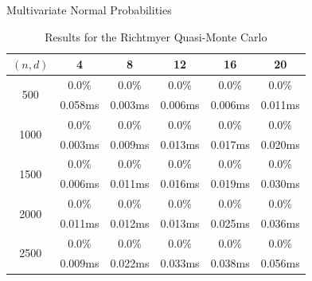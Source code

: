 \begin{frame}{Multivariate Normal Probabilities} 
	\begin{table}[!h]
		\centering
		{
			\begin{tabular}{@{}cccccc@{}}
				\toprule
				$(n, d)$ 				  & 4 		& 8 	  & 12 		& 16 	  & 20	 \\ \midrule
				\multirow{2}{*}{500}  & 0.0\%   & 0.0\%   & 0.0\%   & 0.0\%   & 0.0\% \\
									& 0.058ms & 0.003ms & 0.006ms & 0.006ms & 0.011ms \\
				\multirow{2}{*}{1000} & 0.0\%   & 0.0\%   & 0.0\%   & 0.0\%   & 0.0\% \\
									& 0.003ms & 0.009ms & 0.013ms & 0.017ms & 0.020ms \\
				\multirow{2}{*}{1500} & 0.0\%   & 0.0\%   & 0.0\%   & 0.0\%   & 0.0\% \\
									& 0.006ms & 0.011ms & 0.016ms & 0.019ms & 0.030ms \\
				\multirow{2}{*}{2000} & 0.0\%   & 0.0\%   & 0.0\%   & 0.0\%   & 0.0\% \\
									& 0.011ms & 0.012ms & 0.013ms & 0.025ms & 0.036ms \\
				\multirow{2}{*}{2500} & 0.0\%   & 0.0\%   & 0.0\%   & 0.0\%   & 0.0\% \\
									& 0.009ms & 0.022ms & 0.033ms & 0.038ms & 0.056ms \\ \bottomrule
			\end{tabular}%
		}
		\caption{Results for the Richtmyer Quasi-Monte Carlo}
		\label{tab:results_qmc}
	\end{table}
	

\end{frame}
	
